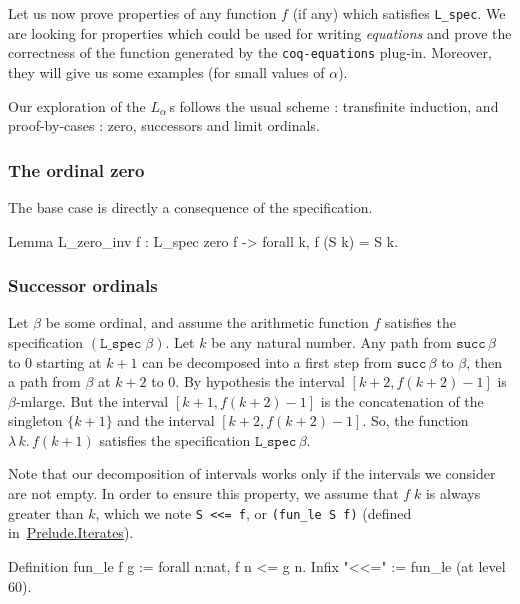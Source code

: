 Let us now prove properties of any function $f$ (if any) which satisfies 
\texttt{L\_spec}. We are looking for properties which could be used for writing \emph{equations} and prove the correctness of the function generated by the \texttt{coq-equations} plug-in. Moreover, they will give us some examples (for small values of $\alpha$).


Our exploration of the $L_\alpha$\,s  follows the usual scheme : transfinite induction, and proof-by-cases : zero, successors and limit ordinals.


\subsubsection{The  ordinal zero}
\label{sect:L-spec-zero}
The base case is directly a consequence of the specification.

\begin{Coqsrc}
Lemma L_zero_inv f : L_spec zero f -> forall k, f (S k) = S k.
\end{Coqsrc}

\subsubsection{Successor ordinals}
\label{sect:L-spec-succ}
Let $\beta$ be some ordinal, and assume the arithmetic function $f$ satisfies 
the specification $(\texttt{L\_spec}\;\beta)$.  Let $k$ be any natural number.
Any path from $\texttt{succ}\,\beta$ to $0$ starting at $k+1$ can be decomposed into a first step from $\texttt{succ}\,\beta$ to $\beta$, then a path from
$\beta$ at $k+2$ to $0$. 
By hypothesis the interval $[k+2, f(k+2)-1]$ is $\beta$-mlarge.
But the interval $[k+1, f(k+2)-1]$ is the concatenation of the singleton
$\{k+1\}$ and the interval $[k+2, f(k+2)-1]$.
So, the function $\lambda\,k.\,f(k+1)$ satisfies the specification $\texttt{L\_spec}\,\beta$.


Note that our decomposition of intervals works only if the intervals we consider are not empty. In order to ensure this property, we assume that $f\;k$ is always greater than $k$, which we note \texttt{S <<= f}, or \texttt{(fun\_le S f)} (defined 
in~\href{../theories/html/hydras.Prelude.Iterates.html\#fun_le}{Prelude.Iterates}).

\begin{Coqsrc}
Definition fun_le f g  := forall n:nat, f n <=  g n.
Infix "<<=" := fun_le (at level 60).
\end{Coqsrc}


